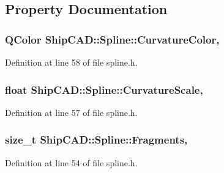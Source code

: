 \subsection{Property Documentation}
\hypertarget{classShipCAD_1_1Spline_ac5268eaa6aadac5db072c7fdeb578ed4}{
\subsubsection[{Curvature\-Color}]{\setlength{\rightskip}{0pt plus 5cm}Q\-Color Ship\-C\-A\-D\-::\-Spline\-::\-Curvature\-Color\hspace{0.3cm}{\ttfamily [read]}, {\ttfamily [write]}}}\label{classShipCAD_1_1Spline_ac5268eaa6aadac5db072c7fdeb578ed4}


Definition at line 58 of file spline.\-h.

\hypertarget{classShipCAD_1_1Spline_a5e8a93a4b5d164f38773e7edbf7753b3}{
\subsubsection[{Curvature\-Scale}]{\setlength{\rightskip}{0pt plus 5cm}float Ship\-C\-A\-D\-::\-Spline\-::\-Curvature\-Scale\hspace{0.3cm}{\ttfamily [read]}, {\ttfamily [write]}}}\label{classShipCAD_1_1Spline_a5e8a93a4b5d164f38773e7edbf7753b3}


Definition at line 57 of file spline.\-h.

\hypertarget{classShipCAD_1_1Spline_a5e4df2a54955094c035f32a442602afc}{
\subsubsection[{Fragments}]{\setlength{\rightskip}{0pt plus 5cm}size\-\_\-t Ship\-C\-A\-D\-::\-Spline\-::\-Fragments\hspace{0.3cm}{\ttfamily [read]}, {\ttfamily [write]}}}\label{classShipCAD_1_1Spline_a5e4df2a54955094c035f32a442602afc}


Definition at line 54 of file spline.\-h.


